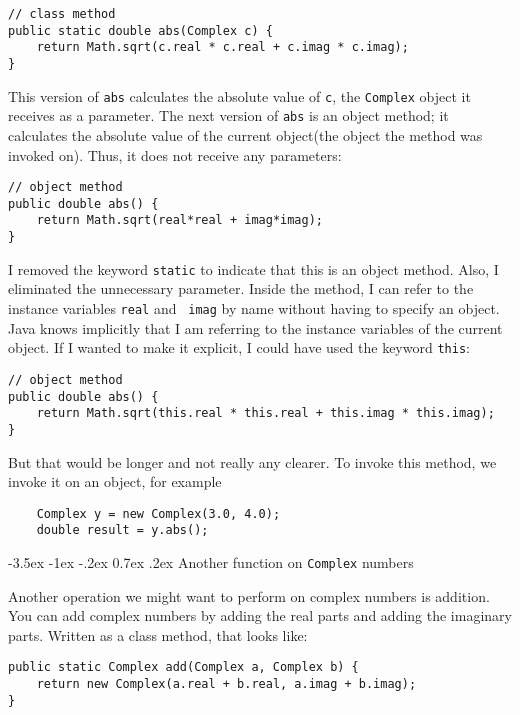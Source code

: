 \documentclass{book}
\makeatletter
\renewcommand{\section}{\@startsection 
    {section} {1} {0mm}%
    {-3.5ex \@plus -1ex \@minus -.2ex}%
    {0.7ex \@plus.2ex}%
    {\normalfont\Large\bfseries}}
\makeatother
\begin{document}
\begin{verbatim}
// class method
public static double abs(Complex c) {
    return Math.sqrt(c.real * c.real + c.imag * c.imag);
} 
\end{verbatim}
%
This version of {\tt abs} calculates the absolute value of {\tt c},
the {\tt Complex} object it receives as a parameter.  The next version
of {\tt abs} is an object method; it calculates the absolute value of
the current object(the object the method was invoked on).  Thus,
it does not receive any parameters:

\begin{verbatim}
// object method
public double abs() {
    return Math.sqrt(real*real + imag*imag);
}
\end{verbatim}
%
I removed the keyword {\tt static} to indicate that this is an object
method.  Also, I eliminated the unnecessary parameter.  Inside the
method, I can refer to the instance variables {\tt real} and {\tt
imag} by name without having to specify an object.  Java knows
implicitly that I am referring to the instance variables of the
current object.  If I wanted to make it explicit, I could have used
the keyword {\tt this}:

\begin{verbatim}
// object method
public double abs() {
    return Math.sqrt(this.real * this.real + this.imag * this.imag);
}
\end{verbatim}

But that would be longer and not really any clearer.  To invoke
this method, we invoke it on an object, for example

\begin{verbatim}
    Complex y = new Complex(3.0, 4.0);
    double result = y.abs();
\end{verbatim}


\section{Another function on {\tt Complex} numbers}

Another operation we might want to perform on complex numbers
is addition.  You can add complex numbers by adding the real
parts and adding the imaginary parts.  Written as a class method,
that looks like:

\begin{verbatim}
public static Complex add(Complex a, Complex b) {
    return new Complex(a.real + b.real, a.imag + b.imag);
}
\end{verbatim}
\end{document}
